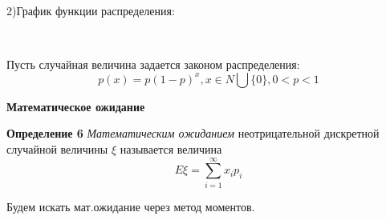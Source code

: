 \documentclass[a4paper,12pt, oneside]{book}
\begin{document}
{	2)График функции распределения:\\
	\begin{minipage}[h]{0.55\linewidth}	
	\end{minipage}
	












\newpage	
{}\\
\vspace{5mm}


Пусть случайная величина задается законом распределения:
$$
p(x) =p (1 - p)^x, x \in N \bigcup \{0\}, 0 < p < 1
$$

\vspace{5mm}
\large{\textbf{Математическое ожидание}}
\vspace{5mm}

\normalsize{\textbf{Определение 6}} \textit{ Математическим ожиданием } неотрицательной дискретной случайной величины $\xi$ называется величина 
$$
E\xi = \sum\limits_{i=1}^\infty x_i p_i
$$

Будем искать мат.ожидание через метод моментов.


}
\end{document}
